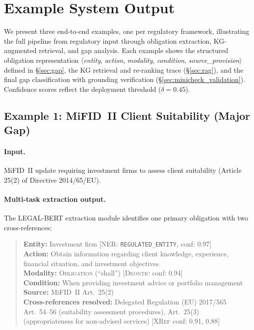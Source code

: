 \documentclass[11pt]{article}
\begin{document}
\section{Example System Output}
\label{app:examples}

We present three end-to-end examples, one per regulatory framework, illustrating the full pipeline from regulatory input through obligation extraction, KG-augmented retrieval, and gap analysis. Each example shows the structured obligation representation $\langle$\textit{entity}, \textit{action}, \textit{modality}, \textit{condition}, \textit{source\_provision}$\rangle$ defined in \S\ref{sec:gap}, the KG retrieval and re-ranking trace (\S\ref{sec:rag}), and the final gap classification with grounding verification (\S\ref{sec:minicheck_validation}). Confidence scores reflect the deployment threshold ($\delta{=}0.45$).

\subsection{Example 1: MiFID~II Client Suitability (Major Gap)}

\paragraph{Input.}  MiFID~II update requiring investment firms to assess client suitability (Article 25(2) of Directive 2014/65/EU).

\paragraph{Multi-task extraction output.}  The LEGAL-BERT extraction module identifies one primary obligation with two cross-references:

\begin{quote}
	\small
	\textbf{Entity:} Investment firm \hfill [\textsc{NER}: \texttt{REGULATED\_ENTITY}, conf: 0.97] \\
	\textbf{Action:} Obtain information regarding client knowledge, experience, financial situation, and investment objectives \\
	\textbf{Modality:} \textsc{Obligation} (``shall'') \hfill [\textsc{Deontic} conf: 0.94] \\
	\textbf{Condition:} When providing investment advice or portfolio management \\
	\textbf{Source:} MiFID~II Art.~25(2) \\
	\textbf{Cross-references resolved:} Delegated Regulation (EU) 2017/565 Art.~54--56 (suitability assessment procedures), Art.~25(3) (appropriateness for non-advised services) \hfill [\textsc{XRef} conf: 0.91, 0.88]
\end{quote}
\end{document}
